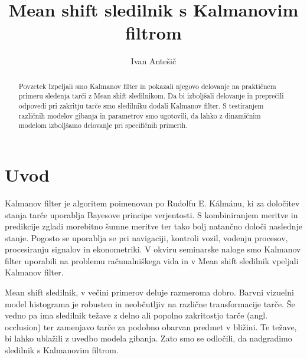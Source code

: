 \documentclass[a4paper]{article}
\begin{document}
\title{Mean shift sledilnik s Kalmanovim filtrom}

\author{Ivan Antešič} %



\maketitle


\begin{abstract}{Povzetek}
Izpeljali smo Kalmanov filter in pokazali njegovo delovanje na praktičnem primeru sledenja tarči z Mean shift sledilnikom. %
Da bi izboljšali delovanje in preprečili odpovedi pri zakritju tarče smo sledilniku dodali Kalmanov filter. S testiranjem različnih modelov gibanja in parametrov smo ugotovili, da lahko z dinamičnim modelom izboljšamo delovanje pri specifičnih primerih. 
\end{abstract}


\section{Uvod}
Kalmanov filter je algoritem poimenovan po Rudolfu E. Kálmánu, ki za določitev stanja tarče uporablja Bayesove principe verjentosti. S kombiniranjem meritve in predikcije zgladi morebitno šumne meritve ter tako bolj natančno določi naslednje stanje. Pogosto se uporablja se pri navigaciji, kontroli vozil, vodenju procesov, procesiranju signalov in ekonometriki. V okviru seminarske naloge smo Kalmanov filter uporabili na problemu računalniškega vida in v Mean shift sledilnik vpeljali Kalmanov filter.

Mean shift sledilnik, v večini primerov deluje razmeroma dobro. Barvni vizuelni model histograma je robusten in neobčutljiv na različne transformacije tarče. Še vedno pa ima sledilnik težave z delno ali popolno zakritostjo tarče (angl. occlusion) ter zamenjavo tarče za podobno obarvan predmet v bližini. Te težave, bi lahko ublažili z uvedbo modela gibanja. Zato smo se odločili, da nadgradimo sledilnik s Kalmanovim filtrom. 
\end{document}

